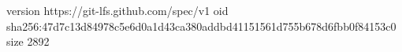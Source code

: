version https://git-lfs.github.com/spec/v1
oid sha256:47d7c13d84978c5e6d0a1d43ca380addbd41151561d755b678d6fbb0f84153c0
size 2892
